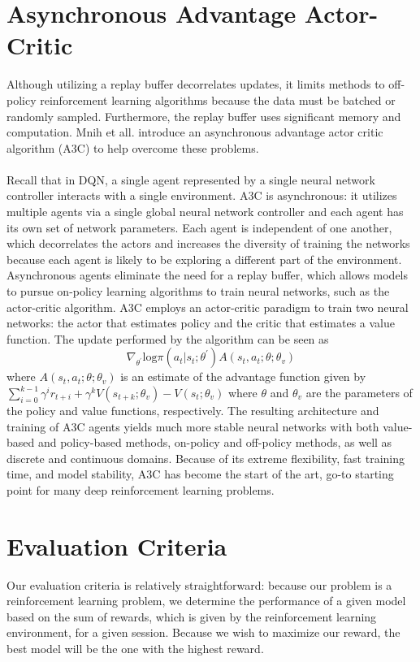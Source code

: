 \documentclass[journal,onecolumn]{IEEEtran}
\begin{document}
\section{Asynchronous Advantage Actor-Critic}
Although utilizing a replay buffer decorrelates updates, it limits methods to off-policy reinforcement learning algorithms because the data must be batched or randomly sampled. Furthermore, the replay buffer uses significant memory and computation. Mnih et all. introduce an asynchronous advantage actor critic algorithm (A3C) to help overcome these problems. \\\\
Recall that in DQN, a single agent represented by a single neural network controller interacts with a single environment. A3C is asynchronous: it utilizes multiple agents via a single global neural network controller and each agent has its own set of network parameters. Each agent is independent of one another, which decorrelates the actors and increases the diversity of training the networks because each agent is likely to be exploring a different part of the environment. Asynchronous agents eliminate the need for a replay buffer, which allows models to pursue on-policy learning algorithms to train neural networks, such as the actor-critic algorithm. A3C employs an actor-critic paradigm to train two neural networks: the actor that estimates policy and the critic that estimates a value function. The update performed by the algorithm can be seen as
\[
\nabla_{\theta^{'}}\text{log}\pi(a_{t}|s_{t};\theta^{'})A(s_{t},a_{t};\theta;\theta_{v})
\]
where $A(s_{t},a_{t};\theta;\theta_{v})$ is an estimate of the advantage function given by $\sum_{i=0}^{k-1}\gamma^{i}r_{t+i}+\gamma^{k}V(s_{t+k};\theta_{v}) - V(s_{t};\theta_{v})$ where $\theta$ and $\theta_{v}$ are the parameters of the policy and value functions, respectively. The resulting architecture and training of A3C agents yields much more stable neural networks with both value-based and policy-based methods, on-policy and off-policy methods, as well as discrete and continuous domains. Because of its extreme flexibility, fast training time, and model stability, A3C has become the start of the art, go-to starting point for many deep reinforcement learning problems. 
\section{Evaluation Criteria}
Our evaluation criteria is relatively straightforward: because our problem is a reinforcement learning problem, we determine the performance of a given model based on the sum of rewards, which is given by the reinforcement learning environment, for a given session. Because we wish to maximize our reward, the best model will be the one with the highest reward. 
\end{document}
